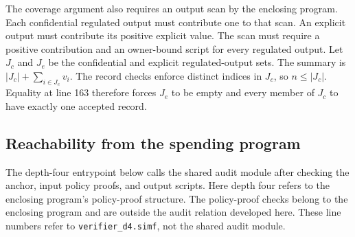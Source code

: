 \begin{auditmapping}
\end{auditmapping}

The coverage argument also requires an output scan by the enclosing program.
Each confidential regulated output must contribute one to that scan. An explicit output must contribute its positive explicit value.
The scan must require a positive contribution and an owner-bound script for every regulated output.
Let $J_c$ and $J_e$ be the confidential and explicit regulated-output sets.
The summary is $|J_c|+\sum_{i\in J_e}v_i$.
The record checks enforce distinct indices in $J_c$, so $n\leq|J_c|$.
Equality at line 163 therefore forces $J_e$ to be empty and every member of $J_c$ to have exactly one accepted record.

\subsection{Reachability from the spending program}

The depth-four entrypoint below calls the shared audit module after checking the anchor, input policy proofs, and output scripts.
Here depth four refers to the enclosing program's policy-proof structure.
The policy-proof checks belong to the enclosing program and are outside the audit relation developed here.
These line numbers refer to \texttt{verifier\_d4.simf}, not the shared audit module.

